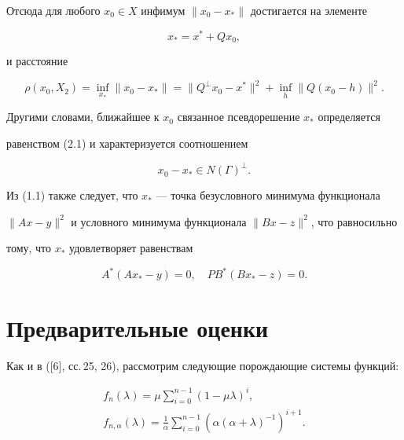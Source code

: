 Отсюда для любого $x_0 \in X$ инфимум $\|x_0-x_*\|$ достигается на элементе


\begin{equation}


x_*=x^*+Qx_0,


\end{equation}


и расстояние 


$$


\rho(x_0, X_2)=\inf_{x_*} \|x_0-x_*\|=


\|Q^\bot x_0-x^*\|^2+\inf_h \|Q(x_0-h)\|^2.


$$


Другими словами, ближайшее к $x_0$ связанное псевдорешение $x_*$ определяется 


равенством (2.1) и характеризуется соотношением 


\begin{equation}


x_0-x_* \in N(\Gamma)^\bot.


\end{equation}





Из (1.1) также следует, что $x_*$ --- точка безусловного минимума функционала 


$\|Ax-y\|^2$ и условного минимума функционала $\|Bx-z\|^2$, что равносильно 


тому, что $x_*$ удовлетворяет равенствам


\begin{equation}


A^*(Ax_*-y)=0,\quad PB^*(Bx_*-z)=0.


\end{equation}








\section{Предварительные оценки}





Как и в ([6], сс.\,25, 26), рассмотрим следующие порождающие системы функций:


\begin{gather}


f_n(\lambda)=\mu\sum_{i=0}^{n-1}(1-\mu\lambda)^i,\\


f_{n,\alpha}(\lambda)=\frac{1}{\alpha}\sum_{i=0}^{n-1}


(\alpha(\alpha+\lambda)^{-1})^{i+1}.


\end{gather}


